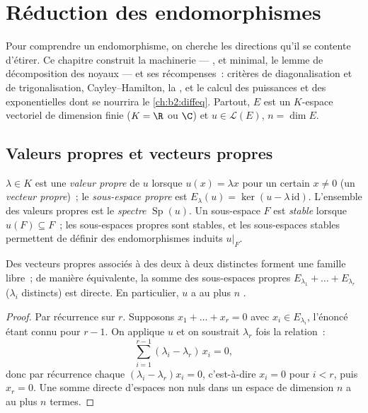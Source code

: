 \chapter{Réduction des endomorphismes}\label{ch:b2:reduction}

Pour comprendre un endomorphisme, on cherche les directions qu'il se
contente d'étirer. Ce chapitre construit la machinerie --- ,  et minimal, le lemme de
décomposition des noyaux --- et ses récompenses~: critères de
diagonalisation et de trigonalisation, Cayley--Hamilton, la
, et le calcul des puissances et des
exponentielles dont se nourrira le \cref{ch:b2:diffeq}. Partout, $E$
est un $K$-espace vectoriel de dimension finie ($K = \R$ ou $\C$) et
$u \in \mathcal{L}(E)$, $n = \dim E$.

\section{Valeurs propres et vecteurs propres}

\begin{definition}\label{def:b2:reduction:eigen}
$\lambda \in K$ est une \emph{valeur propre} de
$u$ lorsque $u(x) = \lambda x$ pour un certain $x \neq 0$ (un
\emph{vecteur propre})~; le \emph{sous-espace propre} est $E_\lambda(u)
= \ker(u - \lambda\,\mathrm{id})$. L'ensemble des valeurs propres est
le \emph{spectre} $\operatorname{Sp}(u)$. Un
sous-espace $F$ est \emph{stable} lorsque $u(F) \subseteq F$~; les
sous-espaces propres sont stables, et les sous-espaces stables
permettent de définir des endomorphismes induits $u|_F$.
\end{definition}

\begin{theorem}\label{thm:b2:reduction:independence}
Des vecteurs propres associés à des  deux à deux
distinctes forment une famille libre~; de manière équivalente, la
somme des sous-espaces propres $E_{\lambda_1} + \dots + E_{\lambda_r}$
($\lambda_i$ distincts) est directe. En particulier, $u$ a au plus $n$
.
\end{theorem}

\begin{proof}
Par récurrence sur $r$. Supposons $x_1 + \dots + x_r = 0$ avec $x_i \in
E_{\lambda_i}$, l'énoncé étant connu pour $r - 1$. On applique $u$ et
on soustrait $\lambda_r$ fois la relation~:
\[
\sum_{i=1}^{r-1} (\lambda_i - \lambda_r)\, x_i = 0 ,
\]
donc par récurrence chaque $(\lambda_i - \lambda_r)x_i = 0$,
c'est-à-dire $x_i = 0$ pour $i < r$, puis $x_r = 0$. Une somme directe
d'espaces non nuls dans un espace de dimension $n$ a au plus $n$
termes.
\end{proof}

